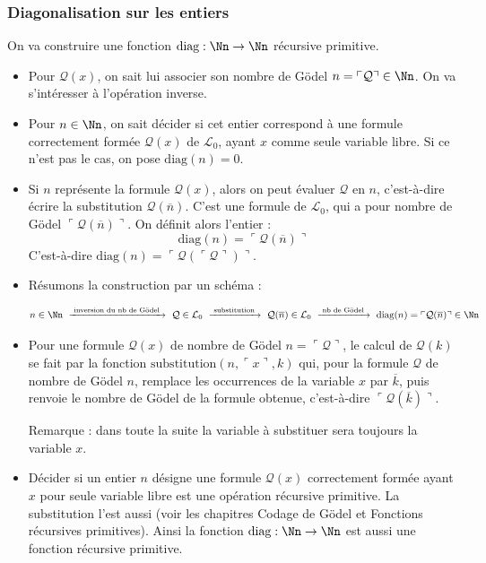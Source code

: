 \documentclass[11pt,class=report,crop=false]{standalone}
\begin{document}
\subsubsection{Diagonalisation sur les entiers}

On va construire une fonction $\text{diag} : \Nn \to \Nn$ récursive primitive.

\begin{itemize}
    \item Pour $\mathcal{Q}(x)$, on sait lui associer son nombre de Gödel $n = \ulcorner \mathcal{Q} \urcorner \in \Nn$. On va s'intéresser à l'opération inverse.
    
    \item Pour $n \in \Nn$, on sait décider si cet entier correspond à une formule correctement formée $\mathcal{Q}(x)$ de $\mathcal{L}_0$, ayant $x$ comme seule variable libre. Si ce n'est pas le cas, on pose $\text{diag}(n)=0$.
    
    \item Si $n$ représente la formule $\mathcal{Q}(x)$, alors on peut évaluer $\mathcal{Q}$ en $n$, c'est-à-dire écrire la substitution $\mathcal{Q}(\overline{n})$. C'est une formule de $\mathcal{L}_0$, qui a pour nombre de Gödel $\ulcorner \mathcal{Q}(\overline{n}) \urcorner$. On définit alors l'entier :
    \[ \text{diag}(n) = \ulcorner \mathcal{Q}(\overline{n}) \urcorner \]
    C'est-à-dire $\text{diag}(n) = \ulcorner \mathcal{Q}({\ulcorner \mathcal{Q} \urcorner}) \urcorner$.

    \item Résumons la construction par un schéma :
    

    \[ n \in \Nn \ \xrightarrow{\text{ inversion du nb de Gödel }} \ \mathcal{Q} \in \mathcal{L}_0 \ \xrightarrow{\text{ substitution }} \ \mathcal{Q}(\overline{n}) \in \mathcal{L}_0 \ \xrightarrow{\text{ nb de Gödel }} \ \text{diag}(n) = \ulcorner \mathcal{Q}(\overline{n}) \urcorner \in \Nn \]

    \medskip

    \item Pour une formule $\mathcal{Q}(x)$ de nombre de Gödel $n = \ulcorner \mathcal{Q} \urcorner$, le calcul de $\mathcal{Q}(k)$ se fait par la fonction $\text{substitution}(n, \ulcorner x \urcorner, k)$ qui, pour la formule $\mathcal{Q}$ de nombre de Gödel $n$, remplace les occurrences de la variable $x$ par $\overline{k}$, puis renvoie le nombre de Gödel de la formule obtenue, c'est-à-dire $\ulcorner \mathcal{Q}(\overline{k}) \urcorner$. 
    
    Remarque : dans toute la suite la variable à substituer sera toujours la variable $x$.

    \item Décider si un entier $n$ désigne une formule $\mathcal{Q}(x)$ correctement formée ayant $x$ pour seule variable libre est une opération récursive primitive. La substitution l'est aussi (voir les chapitres \og{}Codage de Gödel\fg{} et \og{}Fonctions récursives primitives\fg{}).
    Ainsi la fonction $\text{diag} : \Nn \to \Nn$ est aussi une fonction récursive primitive.
\end{itemize}
\end{document}
